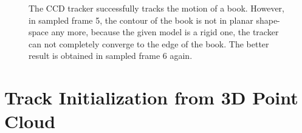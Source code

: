 \begin{figure}[htbp]
\begin{minipage}[t]{0.5\linewidth}
  \end{minipage} 
  \begin{minipage}[t]{0.5\linewidth} 
    \centering 
  \end{minipage} 
  \begin{minipage}[t]{0.5\linewidth} 
    \centering 
  \end{minipage} 
  \caption[The tracking result based on SIFT contour initialization]{The
    CCD tracker successfully tracks the motion of a book. However, in
    sampled frame  5, the contour of the book is not in planar shape-space
    any more, because the given model is a rigid one, the tracker can not
    completely converge to the edge of the book. The better result is
    obtained in sampled frame 6 again.
  }
  \label{fig:sifttracker}
\end{figure}


\section{Track Initialization from 3D Point Cloud}
\label{sec:tifpc}

